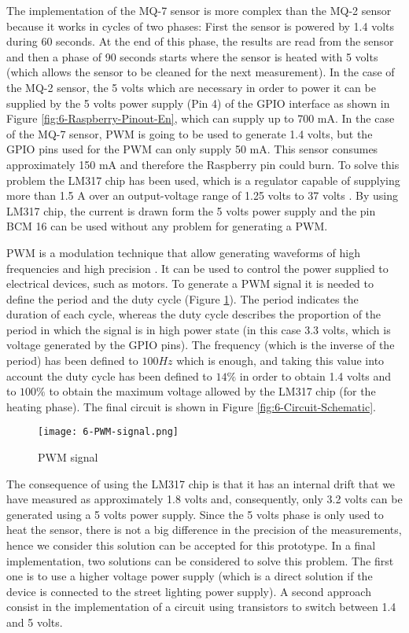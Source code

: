 The implementation of the MQ-7 sensor is more complex than the MQ-2 sensor because it works in cycles of two phases: First the sensor is powered by 1.4 volts during 60 seconds. At the end of this phase, the results are read from the sensor and then a phase of 90 seconds starts where the sensor is heated with 5 volts (which allows the sensor to be cleaned for the next measurement). In the case of the MQ-2 sensor, the 5 volts which are necessary in order to power it can be supplied by the 5 volts power supply (Pin 4) of the GPIO interface as shown in Figure \ref{fig:6-Raspberry-Pinout-En}, which can supply up to 700 mA. In the case of the MQ-7 sensor, \ac{PWM} is going to be used to generate 1.4 volts, but the GPIO pins used for the \ac{PWM} can only supply 50 mA. This sensor consumes approximately 150 mA and therefore the Raspberry pin could burn. To solve this problem the LM317 chip has been used, which is a regulator capable of supplying more than 1.5 A over an output-voltage range of 1.25 volts to 37 volts \cite{LM317}. By using LM317 chip, the current is drawn form the 5 volts power supply and the pin BCM 16 can be used without any problem for generating a \ac{PWM}.

\ac{PWM} is a modulation technique that allow generating waveforms of high frequencies and high precision \cite{DdlT16}. It can be used to control the power supplied to electrical devices, such as motors. To generate a \ac{PWM} signal it is needed to define the period and the duty cycle (Figure \ref{fig:6-PWM-signal}). The period indicates the duration of each cycle, whereas the duty cycle describes the proportion of the period in which the signal is in high power state (in this case 3.3 volts, which is voltage generated by the GPIO pins). The frequency (which is the inverse of the period) has been defined to $100 Hz$ which is enough, and taking this value into account the duty cycle has been defined to $14\%$ in order to obtain 1.4 volts and to $100\%$ to obtain the maximum voltage allowed by the LM317 chip (for the heating phase). The final circuit is shown in Figure \ref{fig:6-Circuit-Schematic}.

\begin{figure}[!h]
	\begin{center}
		\texttt{[image: 6-PWM-signal.png]}
		\caption{PWM signal}
		\label{fig:6-PWM-signal}
	\end{center}
\end{figure}

The consequence of using the LM317 chip is that it has an internal drift that we have measured as approximately 1.8 volts and, consequently, only 3.2 volts can be generated using a 5 volts power supply. Since the 5 volts phase is only used to heat the sensor, there is not a big difference in the precision of the measurements, hence we consider this solution can be accepted for this prototype. In a final implementation, two solutions can be considered to solve this problem. The first one is to use a higher voltage power supply (which is a direct solution if the device is connected to the street lighting power supply). A second approach consist in the implementation of a circuit using transistors to switch between 1.4 and 5 volts.


